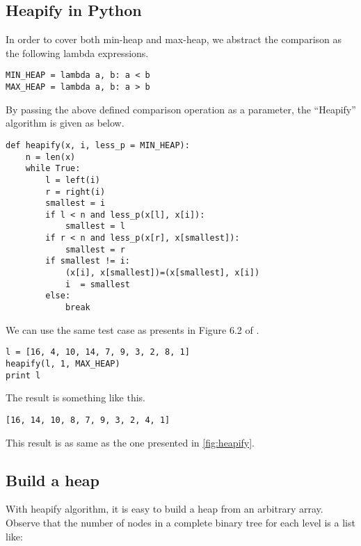 \documentclass{article}
\begin{document}
\subsection*{Heapify in Python}

In order to cover both min-heap and max-heap, we abstract the comparison
as the following lambda expressions.

\lstset{language = Python}
\begin{lstlisting}
MIN_HEAP = lambda a, b: a < b
MAX_HEAP = lambda a, b: a > b 
\end{lstlisting}

By passing the above defined comparison operation as a parameter, the ``Heapify''
algorithm is given as below.

\begin{lstlisting}
def heapify(x, i, less_p = MIN_HEAP):
    n = len(x)
    while True:
        l = left(i)
        r = right(i)
        smallest = i
        if l < n and less_p(x[l], x[i]):
            smallest = l
        if r < n and less_p(x[r], x[smallest]):
            smallest = r
        if smallest != i:
            (x[i], x[smallest])=(x[smallest], x[i])
            i  = smallest
        else:
            break
\end{lstlisting}

We can use the same test case as presents in Figure 6.2 of \cite{CLRS}.

\begin{lstlisting}
l = [16, 4, 10, 14, 7, 9, 3, 2, 8, 1]
heapify(l, 1, MAX_HEAP)
print l 
\end{lstlisting}

The result is something like this.

\begin{verbatim}
[16, 14, 10, 8, 7, 9, 3, 2, 4, 1] 
\end{verbatim}

This result is as same as the one presented in \ref{fig:heapify}.

\subsection{Build a heap}

With heapify algorithm, it is easy to build a heap from an arbitrary 
array. Observe that the number of nodes in a complete binary tree
for each level is a list like:
\end{document}
